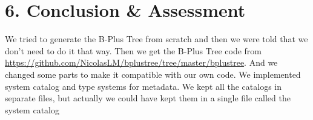 \documentclass[
]{article}
\begin{document}
\hypertarget{conclusion-assessment}{%
\section{6. Conclusion \& Assessment}\label{conclusion-assessment}}

We tried to generate the B-Plus Tree from scratch and then we were told
that we don't need to do it that way. Then we get the B-Plus Tree code
from \url{https://github.com/NicolasLM/bplustree/tree/master/bplustree}.
And we changed some parts to make it compatible with our own code. We
implemented system catalog and type systems for metadata. We kept all
the catalogs in separate files, but actually we could have kept them in
a single file called the system catalog
\end{document}
